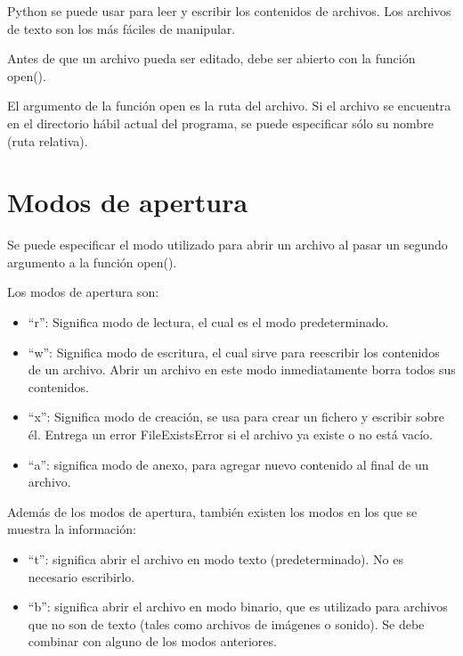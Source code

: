 \documentclass{report}
\newcommand{\doble}[1]{``#1''}
\begin{document}
Python se puede usar para leer y escribir los contenidos de archivos. Los archivos de texto son los más fáciles de manipular.\smallskip

Antes de que un archivo pueda ser editado, debe ser abierto con la función open().


El argumento de la función open es la ruta del archivo. Si el archivo se encuentra en el directorio hábil actual del programa, se puede especificar sólo su nombre (ruta relativa).

\section{Modos de apertura}

Se puede especificar el modo utilizado para abrir un archivo al pasar un segundo argumento a la función open().

Los modos de apertura son:

\begin{itemize}
  \item \doble{r}: Significa modo de lectura, el cual es el modo predeterminado.
  

  \item \doble{w}: Significa modo de escritura, el cual sirve para reescribir los contenidos de un archivo. Abrir un archivo en este modo inmediatamente borra todos sus contenidos.
  

  \item \doble{x}: Significa modo de creación, se usa para crear un fichero y escribir sobre él. Entrega un error FileExistsError si el archivo ya existe o no está vacío.
  

  \item \doble{a}: significa modo de anexo, para agregar nuevo contenido al final de un archivo.


\end{itemize}

Además de los modos de apertura, también existen los modos en los que se muestra la información:

\begin{itemize}
  \item \doble{t}: significa abrir el archivo en modo texto (predeterminado). No es necesario escribirlo.
  
  \item \doble{b}: significa abrir el archivo en modo binario, que es utilizado para archivos que no son de texto (tales como archivos de imágenes o sonido). Se debe combinar con alguno de los modos anteriores.


\end{itemize}
\end{document}
